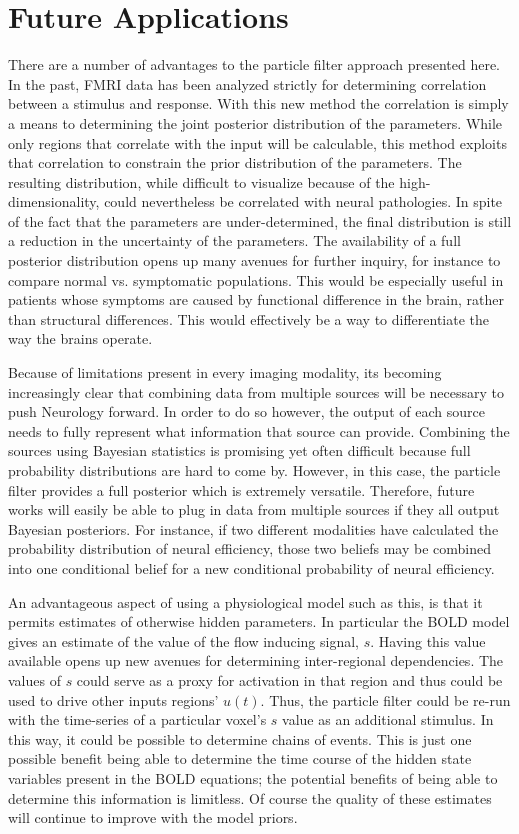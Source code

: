 \section{Future Applications}
There are a number of advantages to the particle filter approach presented
here. In the past, FMRI data has been analyzed strictly for determining
correlation between a stimulus and response. With this new method
the correlation is simply a means to determining the joint posterior distribution
of the parameters. While only regions that correlate with the input will
be calculable, this method exploits that correlation to constrain the
prior distribution of the parameters. The resulting distribution, while difficult
to visualize because of the high-dimensionality, could nevertheless be
correlated with neural pathologies. In spite of the fact that the parameters
are under-determined, the final distribution is still a reduction in the
uncertainty of the parameters. The availability of a full posterior distribution
opens up many avenues for further inquiry, for instance
to compare normal vs. symptomatic
populations. This would be especially useful in patients whose symptoms
are caused by functional difference in the brain, rather than structural differences.
This would effectively be
a way to differentiate the way the brains operate.

Because of limitations present in every imaging modality,
its becoming increasingly clear that combining data from multiple sources
will be necessary to push Neurology forward. In order to do so however, the
output of each source needs to fully represent what information that source
can provide. Combining the sources using Bayesian statistics is promising
yet often difficult because full probability distributions are hard to come by.
However, in this case, the particle filter provides a full posterior which
is extremely versatile. Therefore, future works will easily be able to
plug in data from multiple sources if they all output Bayesian posteriors.
For instance, if two different modalities have calculated the probability
distribution of neural efficiency, those two beliefs may be combined into
one conditional belief for a new conditional probability of neural efficiency.

An advantageous aspect of using a physiological model such as this, is that
it permits estimates of otherwise hidden parameters. In particular the BOLD
model gives an estimate of the value of the flow inducing signal, $s$. Having
this value available opens up new avenues for determining inter-regional
dependencies. The values of $s$ could serve as a proxy for activation in
that region and thus could be used to drive other inputs regions' $u(t)$.
Thus, the particle filter could be re-run
with the time-series of a particular voxel's $s$ value as an additional stimulus.
In this way, it could be possible to determine chains of events. This is just
one possible benefit being able to determine the time course of the hidden
state variables present in the BOLD equations; the potential benefits of being
able to determine this information is limitless. Of course the quality of these
estimates will continue to improve with the model priors.


